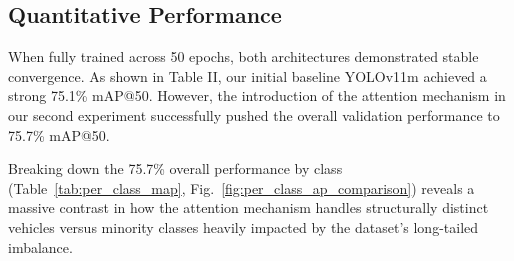 \documentclass[conference]{IEEEtran}
\begin{document}
\subsection{Quantitative Performance}
When fully trained across 50 epochs, both architectures demonstrated stable convergence. As shown in Table II, our initial baseline YOLOv11m achieved a strong 75.1\% mAP@50. However, the introduction of the attention mechanism in our second experiment successfully pushed the overall validation performance to 75.7\% mAP@50.


\begin{table}[htbp]
\caption{Overall Performance Comparison}
\centering
{}
\label{tab:ablation_overall}
\end{table}


Breaking down the 75.7\% overall performance by class (Table~\ref{tab:per_class_map}, Fig.~\ref{fig:per_class_ap_comparison}) reveals a massive contrast in how the attention mechanism handles structurally distinct vehicles versus minority classes heavily impacted by the dataset's long-tailed imbalance.

\begin{table}[htbp]
\caption{Per-Class Average Precision (mAP@0.50)}
\centering
{}
\label{tab:per_class_map}
\end{table}
\end{document}
